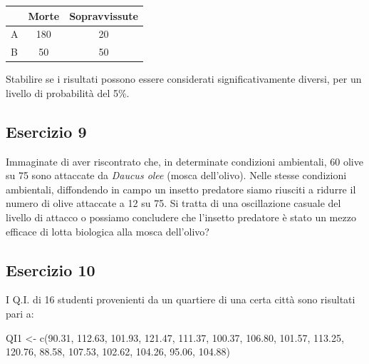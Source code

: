 \documentclass[a4paper,12pt,oneside]{book}
\newenvironment{Shaded}{\begin{snugshade}}{\end{snugshade}}
\newcommand{\FloatTok}[1]{#1}
\newcommand{\OtherTok}[1]{#1}
\newcommand{\FunctionTok}[1]{#1}
\newcommand{\NormalTok}[1]{#1}
\begin{document}
\begin{longtable}[]{@{}lcc@{}}
\toprule()
& Morte & Sopravvissute \\
\midrule()
\endhead
A & 180 & 20 \\
B & 50 & 50 \\
\bottomrule()
\end{longtable}

Stabilire se i risultati possono essere considerati significativamente diversi, per un livello di probabilità del 5\%.

\hypertarget{esercizio-9-1}{%
\subsection{Esercizio 9}\label{esercizio-9-1}}

Immaginate di aver riscontrato che, in determinate condizioni ambientali, 60 olive su 75 sono attaccate da \emph{Daucus olee} (mosca dell'olivo). Nelle stesse condizioni ambientali, diffondendo in campo un insetto predatore siamo riusciti a ridurre il numero di olive attaccate a 12 su 75. Si tratta di una oscillazione casuale del livello di attacco o possiamo concludere che l'insetto predatore è stato un mezzo efficace di lotta biologica alla mosca dell'olivo?

\hypertarget{esercizio-10-1}{%
\subsection{Esercizio 10}\label{esercizio-10-1}}

I Q.I. di 16 studenti provenienti da un quartiere di una certa città sono risultati pari a:

\begin{Shaded}
\begin{Highlighting}[]
\NormalTok{QI1 }\OtherTok{\textless{}{-}} \FunctionTok{c}\NormalTok{(}\FloatTok{90.31}\NormalTok{, }\FloatTok{112.63}\NormalTok{, }\FloatTok{101.93}\NormalTok{, }\FloatTok{121.47}\NormalTok{, }\FloatTok{111.37}\NormalTok{, }\FloatTok{100.37}\NormalTok{, }\FloatTok{106.80}\NormalTok{,}
         \FloatTok{101.57}\NormalTok{, }\FloatTok{113.25}\NormalTok{, }\FloatTok{120.76}\NormalTok{,  }\FloatTok{88.58}\NormalTok{, }\FloatTok{107.53}\NormalTok{, }\FloatTok{102.62}\NormalTok{, }\FloatTok{104.26}\NormalTok{,}
         \FloatTok{95.06}\NormalTok{, }\FloatTok{104.88}\NormalTok{)}
\end{Highlighting}
\end{Shaded}
\end{document}
